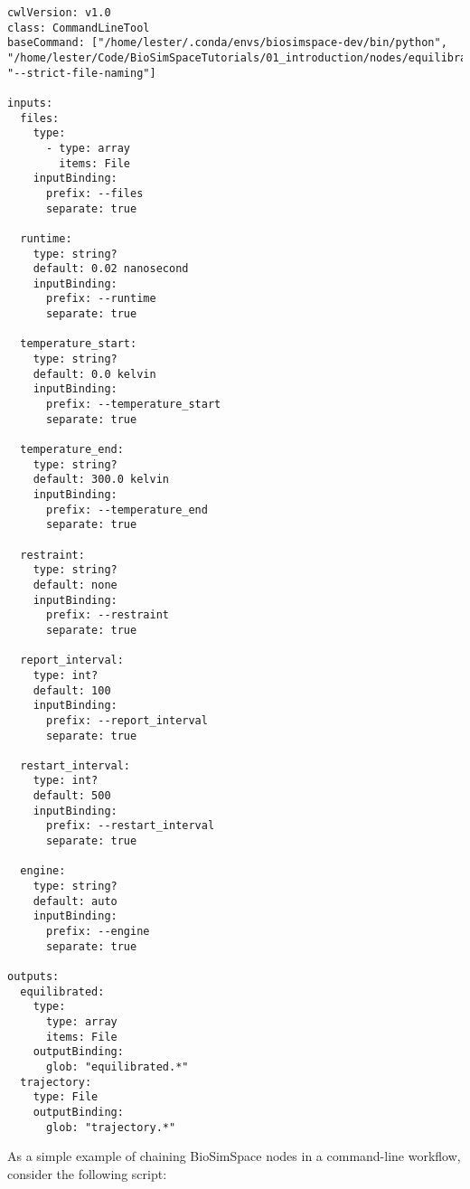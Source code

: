 \begin{verbatim}
cwlVersion: v1.0
class: CommandLineTool
baseCommand: ["/home/lester/.conda/envs/biosimspace-dev/bin/python", "/home/lester/Code/BioSimSpaceTutorials/01_introduction/nodes/equilibrate.py", "--strict-file-naming"]

inputs:
  files:
    type:
      - type: array
        items: File
    inputBinding:
      prefix: --files
      separate: true

  runtime:
    type: string?
    default: 0.02 nanosecond
    inputBinding:
      prefix: --runtime
      separate: true

  temperature_start:
    type: string?
    default: 0.0 kelvin
    inputBinding:
      prefix: --temperature_start
      separate: true

  temperature_end:
    type: string?
    default: 300.0 kelvin
    inputBinding:
      prefix: --temperature_end
      separate: true

  restraint:
    type: string?
    default: none
    inputBinding:
      prefix: --restraint
      separate: true

  report_interval:
    type: int?
    default: 100
    inputBinding:
      prefix: --report_interval
      separate: true

  restart_interval:
    type: int?
    default: 500
    inputBinding:
      prefix: --restart_interval
      separate: true

  engine:
    type: string?
    default: auto
    inputBinding:
      prefix: --engine
      separate: true

outputs:
  equilibrated:
    type:
      type: array
      items: File
    outputBinding:
      glob: "equilibrated.*"
  trajectory:
    type: File
    outputBinding:
      glob: "trajectory.*"
\end{verbatim}

As a simple example of chaining BioSimSpace nodes in a command-line
workflow, consider the following script:

\begin{Shaded}
\begin{Highlighting}[]

 

 

 

 

 

 
\end{Highlighting}
\end{Shaded}

